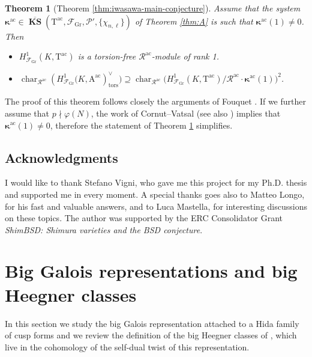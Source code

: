 \documentclass[12pt,reqno]{amsart}
\newtheorem{theoremx}{Theorem}
\theoremstyle{definition}
\theoremstyle{remark}
\newcommand{\T}{\boldsymbol{\mathrm{T}}}
\newcommand{\calR}{\mathcal{R}}
\newcommand{\A}{\boldsymbol{\mathrm{A}}}
\DeclareMathOperator{\Char}{char}
\DeclareMathOperator{\ks}{KS}
\newcommand{\KS}{\boldsymbol{\ks}}
\newcommand{\ac}{\mathrm{ac}}
\newcommand{\Gr}{\mathrm{Gr}}
\newcommand{\tors}{\mathrm{tors}}
\newcommand{\gk}{\kappa}
\begin{document}
\begin{theoremx}[Theorem \ref{thm:iwasawa-main-conjecture}]\label{thm:B}
    Assume that the system $\boldsymbol{\gk}^\ac\in \overline{\KS}(\T^\ac,\mathcal{F}_\Gr,\mathcal{P}',\{\chi_{n,\ell}\})$ of Theorem \ref{thm:A} is such that $\boldsymbol{\gk}^{\ac}(1)\ne 0$. Then  
    \begin{itemize}
        \item[(a)] $H^1_{\mathcal{F}_\Gr}(K,\T^\ac)$ is a torsion-free  $\calR^\ac$-module of rank 1.
        \item[(b)] $\Char_{\calR^\ac}(H^1_{\mathcal{F}_\Gr}\big(K,\A^\ac)^\vee_{\tors}\big)\supseteq \Char_{\calR^\ac}\big(H^1_{\mathcal{F}_\Gr}(K,\T^{\ac})/\calR^\ac\cdot \boldsymbol{\gk}^\ac(1)\big)^2$.
    \end{itemize}
\end{theoremx}

The proof of this theorem follows closely the arguments of Fouquet \cite[§5-6]{Fouquet13:Dihedral}. If we further assume that $p\nmid\varphi(N)$, the work of Cornut--Vatsal \cite{cornut-vatsal2007:nontriviality} (see also \cite[Corollary 3.1.2]{Howard07:variation-of-Heegner-points-in-Hida-families}) implies that $\boldsymbol{\gk}^\ac(1)\ne 0$, therefore the statement of Theorem \ref{thm:B} simplifies. 

\subsection{Acknowledgments}
I would like to thank Stefano Vigni, who gave me this project for my Ph.D. thesis and supported me in every moment. A special thanks goes also to Matteo Longo, for his fast and valuable answers, and to Luca Mastella, for interesting discussions on these topics. The author was supported by the ERC Consolidator Grant \emph{ShimBSD: Shimura varieties and the BSD conjecture}.




\section{Big Galois representations and big Heegner classes}

In this section we study the big Galois representation attached to a Hida family of cusp forms and we review the definition of the big Heegner classes of \cite{Longo-Vigni11:quaternion-algebras-Hida-families}, which live in the cohomology of the self-dual twist of this representation.
\end{document}

